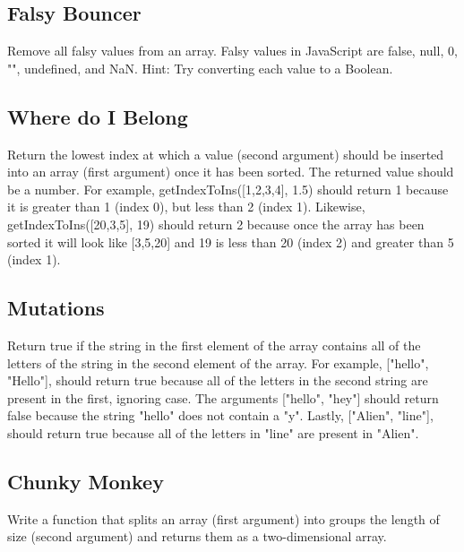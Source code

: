 \documentclass{article}%
\begin{document}
%
\subsection{Falsy Bouncer}%
\label{subsec:FalsyBouncer}%
Remove all falsy values from an array.\newline%
Falsy values in JavaScript are false, null, 0, "", undefined, and NaN.\newline%
Hint: Try converting each value to a Boolean.\newline%

%
\subsection{Where do I Belong}%
\label{subsec:WheredoIBelong}%
Return the lowest index at which a value (second argument) should be inserted into an array (first argument) once it has been sorted. The returned value should be a number.\newline%
For example, getIndexToIns({[}1,2,3,4{]}, 1.5) should return 1 because it is greater than 1 (index 0), but less than 2 (index 1).\newline%
Likewise, getIndexToIns({[}20,3,5{]}, 19) should return 2 because once the array has been sorted it will look like {[}3,5,20{]} and 19 is less than 20 (index 2) and greater than 5 (index 1).\newline%

%
\subsection{Mutations}%
\label{subsec:Mutations}%
Return true if the string in the first element of the array contains all of the letters of the string in the second element of the array.\newline%
For example, {[}"hello", "Hello"{]}, should return true because all of the letters in the second string are present in the first, ignoring case.\newline%
The arguments {[}"hello", "hey"{]} should return false because the string "hello" does not contain a "y".\newline%
Lastly, {[}"Alien", "line"{]}, should return true because all of the letters in "line" are present in "Alien".\newline%

%
\subsection{Chunky Monkey}%
\label{subsec:ChunkyMonkey}%
Write a function that splits an array (first argument) into groups the length of size (second argument) and returns them as a two{-}dimensional array.\newline%
\end{document}
